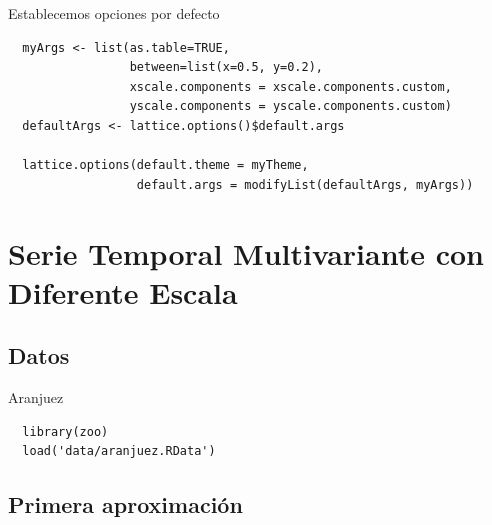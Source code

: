 \documentclass[xcolor={usenames,svgnames,dvipsnames}]{beamer}
\begin{document}
\begin{frame}[fragile,label=sec-1-2-4]{Establecemos opciones por defecto}
 \lstset{language=R,label= ,caption= ,numbers=none}
\begin{lstlisting}
  myArgs <- list(as.table=TRUE,
                 between=list(x=0.5, y=0.2),
                 xscale.components = xscale.components.custom,
                 yscale.components = yscale.components.custom)
  defaultArgs <- lattice.options()$default.args
  
  lattice.options(default.theme = myTheme,
                  default.args = modifyList(defaultArgs, myArgs))
\end{lstlisting}
\end{frame}


\section{Serie Temporal Multivariante con Diferente Escala}
\label{sec-2}

\subsection{Datos}
\label{sec-2-1}

\begin{frame}[fragile,label=sec-2-1-1]{Aranjuez}
 \lstset{language=R,label= ,caption= ,numbers=none}
\begin{lstlisting}
  library(zoo)
  load('data/aranjuez.RData')
\end{lstlisting}
\end{frame}

\subsection{Primera aproximación}
\label{sec-2-2}
\end{document}
